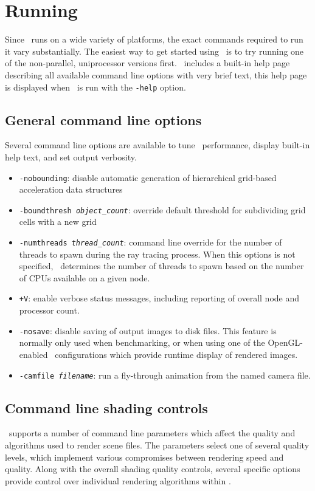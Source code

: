\section{Running \RAY}
  Since \RAY\ runs on a wide variety of platforms, the exact commands
required to run it vary substantially.  The easiest way to get started
using \RAY\ is to try running one of the non-parallel, uniprocessor
versions first.  \RAY\ includes a built-in help page describing all
available command line options with very brief text, this help page is
displayed when \RAY\ is run with the {\tt -help} option.


\subsection{General command line options}
Several command line options are available to tune 
\RAY\ performance, display built-in help text, and 
set output verbosity.
\begin{itemize}
\item{{\tt -nobounding}}: disable automatic generation of hierarchical
      grid-based acceleration data structures
\item{{\tt -boundthresh {\it object\_count}}}: override default threshold for 
      subdividing grid cells with a new grid
\item{{\tt -numthreads {\it thread\_count}}}: command line override for the number of 
      threads to spawn during the ray tracing process.  When this
      options is not specified, \RAY\ determines the number of threads
      to spawn based on the number of CPUs available on a given node.
\item{{\tt +V}}: enable verbose status messages, including reporting of
      overall node and processor count.
\item{{\tt -nosave}}: disable saving of output images to disk files.  This 
      feature is normally only used when benchmarking, or when using one of
      the OpenGL-enabled \RAY\ configurations which provide runtime display
      of rendered images.
\item{{\tt -camfile {\it filename}}}: run a fly-through animation from 
      the named camera file. 
\end{itemize}

\subsection{Command line shading controls}
\RAY\ supports a number of command line parameters which affect the
quality and algorithms used to render scene files.  The parameters 
select one of several quality levels, which implement various 
compromises between rendering speed and quality.  Along with the
overall shading quality controls, several specific options provide 
control over individual rendering algorithms within \RAY.

